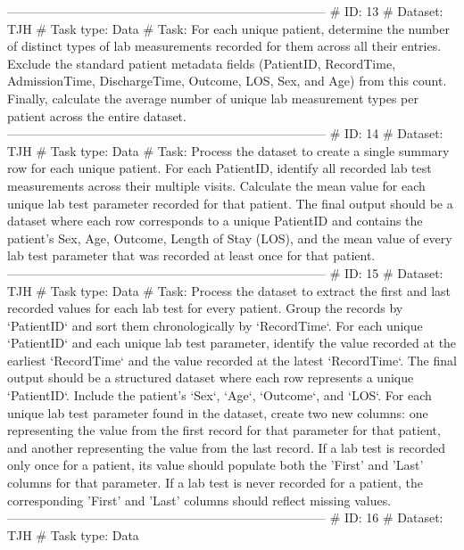 \begin{tcolorbox}[colback=cadmiumgreen!5!white,colframe=forestgreen!75!white,breakable,title=\textit{Generated analytical tasks in task 4.}]
\begin{VerbatimWrap}
-----------------------------------------------------------------------------
# ID: 13  
# Dataset: TJH 
# Task type: Data
# Task: For each unique patient, determine the number of distinct types of lab measurements recorded for them across all their entries. Exclude the standard patient metadata fields (PatientID, RecordTime, AdmissionTime, DischargeTime, Outcome, LOS, Sex, and Age) from this count. Finally, calculate the average number of unique lab measurement types per patient across the entire dataset.
-----------------------------------------------------------------------------
# ID: 14  
# Dataset: TJH 
# Task type: Data
# Task: Process the dataset to create a single summary row for each unique patient. For each PatientID, identify all recorded lab test measurements across their multiple visits. Calculate the mean value for each unique lab test parameter recorded for that patient. The final output should be a dataset where each row corresponds to a unique PatientID and contains the patient's Sex, Age, Outcome, Length of Stay (LOS), and the mean value of every lab test parameter that was recorded at least once for that patient.
-----------------------------------------------------------------------------
# ID: 15  
# Dataset: TJH 
# Task type: Data
# Task: Process the dataset to extract the first and last recorded values for each lab test for every patient. Group the records by `PatientID` and sort them chronologically by `RecordTime`. For each unique `PatientID` and each unique lab test parameter, identify the value recorded at the earliest `RecordTime` and the value recorded at the latest `RecordTime`. The final output should be a structured dataset where each row represents a unique `PatientID`. Include the patient's `Sex`, `Age`, `Outcome`, and `LOS`. For each unique lab test parameter found in the dataset, create two new columns: one representing the value from the first record for that parameter for that patient, and another representing the value from the last record. If a lab test is recorded only once for a patient, its value should populate both the 'First' and 'Last' columns for that parameter. If a lab test is never recorded for a patient, the corresponding 'First' and 'Last' columns should reflect missing values.
-----------------------------------------------------------------------------
# ID: 16  
# Dataset: TJH 
# Task type: Data

\end{VerbatimWrap}
\end{tcolorbox}
